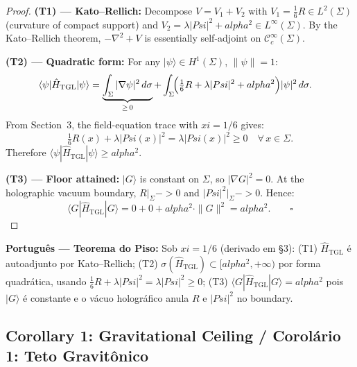 \documentclass[12pt,a4paper]{article}
\def\Psi{Psi}%
\def\to{ -> }%
\def\alpha{alpha}%
\def\xi{xi}%
\begin{document}
\begin{proof}
\textbf{(T1) --- Kato--Rellich:}
Decompose $V = V_1 + V_2$ with $V_1 = \frac{1}{6}R \in L^2(\Sigma)$ (curvature of compact support) and $V_2 = \lambda|\Psi|^2 + \alpha^2 \in L^\infty(\Sigma)$. By the Kato--Rellich theorem, $-\nabla^2 + V$ is essentially self-adjoint on $\mathcal{C}_c^\infty(\Sigma)$.

\textbf{(T2) --- Quadratic form:}
For any $|\psi\rangle \in H^1(\Sigma)$, $\|\psi\|=1$:
\begin{align}
\langle\psi|\hat{H}_{\text{TGL}}|\psi\rangle
&= \underbrace{\int_\Sigma |\nabla\psi|^2\,d\sigma}_{\geq\,0}
+ \int_\Sigma \!\Bigl(\tfrac{1}{6}R + \lambda|\Psi|^2 + \alpha^2\Bigr)|\psi|^2\,d\sigma.
\end{align}
From Section~3, the field-equation trace with $\xi=1/6$ gives:
\begin{equation}
\tfrac{1}{6}R(x) + \lambda|\Psi(x)|^2 = \lambda|\Psi(x)|^2 \geq 0 \quad \forall\, x \in \Sigma.
\end{equation}
Therefore $\langle\psi|\hat{H}_{\text{TGL}}|\psi\rangle \geq \alpha^2$.

\textbf{(T3) --- Floor attained:}
$|G\rangle$ is constant on $\Sigma$, so $|\nabla G|^2 = 0$. At the holographic vacuum boundary, $R|_\Sigma \to 0$ and $|\Psi|^2|_\Sigma \to 0$. Hence:
\begin{equation}
\langle G|\hat{H}_{\text{TGL}}|G\rangle = 0 + 0 + \alpha^2 \cdot \|G\|^2 = \alpha^2. \qquad \square
\end{equation}
\end{proof}

\textbf{Português --- Teorema do Piso:} Sob $\xi=1/6$ (derivado em §3): (T1) $\hat{H}_{\text{TGL}}$ é autoadjunto por Kato--Rellich; (T2) $\sigma(\hat{H}_{\text{TGL}}) \subset [\alpha^2,+\infty)$ por forma quadrática, usando $\frac{1}{6}R + \lambda|\Psi|^2 = \lambda|\Psi|^2 \geq 0$; (T3) $\langle G|\hat{H}_{\text{TGL}}|G\rangle = \alpha^2$ pois $|G\rangle$ é constante e o vácuo holográfico anula $R$ e $|\Psi|^2$ no boundary.

\subsection{Corollary 1: Gravitational Ceiling / Corolário 1: Teto Gravitônico}
\end{document}
